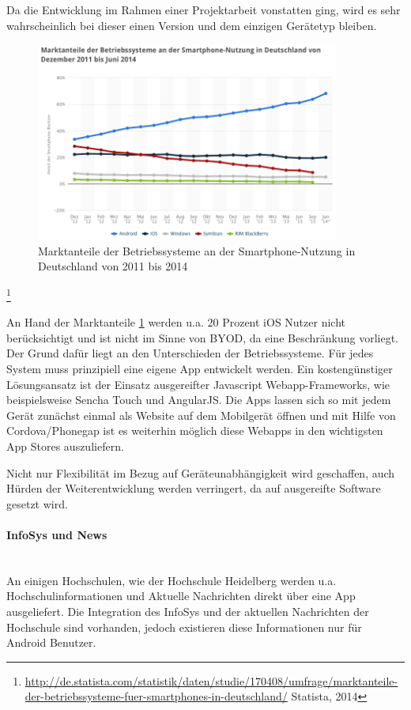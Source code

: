 \documentclass[a4paper, 12pt]{scrreprt}
\begin{document}
Da die Entwicklung im Rahmen einer Projektarbeit vonstatten ging, wird es sehr wahrscheinlich bei dieser einen Version und dem einzigen Gerätetyp bleiben.

\begin{figure}[h!]
	\centering
	\includegraphics[width=10cm]{bilder_aurel/marktanteile}
	\caption{Marktanteile der Betriebssysteme an der Smartphone-Nutzung in Deutschland von 2011 bis 2014}
	\label{fig_marktanteile}
\end{figure}
\footnote{\url{http://de.statista.com/statistik/daten/studie/170408/umfrage/marktanteile-der-betriebssysteme-fuer-smartphones-in-deutschland/} Statista, 2014}

An Hand der Marktanteile \ref{fig_marktanteile} werden u.a. 20 Prozent iOS Nutzer nicht berücksichtigt und ist nicht im Sinne von BYOD, da eine Beschränkung vorliegt. Der Grund dafür liegt an den Unterschieden der Betriebssysteme. Für jedes System muss prinzipiell eine eigene App entwickelt werden. Ein kostengünstiger Lösungsansatz ist der Einsatz ausgereifter Javascript Webapp-Frameworks, wie beispielsweise Sencha Touch und AngularJS. Die Apps lassen sich so mit jedem Gerät zunächst einmal als Website auf dem Mobilgerät öffnen und mit Hilfe von Cordova/Phonegap ist es weiterhin möglich diese Webapps in den wichtigsten App Stores auszuliefern.

Nicht nur Flexibilität im Bezug auf Geräteunabhängigkeit wird geschaffen, auch Hürden der Weiterentwicklung werden verringert, da auf ausgereifte Software gesetzt wird.


\paragraph{InfoSys und News}\mbox{}\\ %
An einigen Hochschulen, wie der Hochschule Heidelberg werden u.a. Hochschulinformationen und Aktuelle Nachrichten direkt über eine App ausgeliefert. Die Integration des InfoSys und der aktuellen Nachrichten der Hochschule sind vorhanden, jedoch existieren diese Informationen nur für Android Benutzer.
\end{document}
